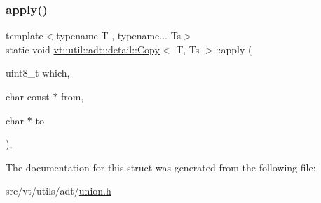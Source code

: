 \subsubsection{\texorpdfstring{apply()}{apply()}}
{\footnotesize\ttfamily template$<$typename T , typename... Ts$>$ \\
static void \hyperlink{structvt_1_1util_1_1adt_1_1detail_1_1_copy}{vt\+::util\+::adt\+::detail\+::\+Copy}$<$ T, Ts $>$\+::apply (\begin{DoxyParamCaption}\item[{uint8\+\_\+t}]{which,  }\item[{char const $\ast$}]{from,  }\item[{char $\ast$}]{to }\end{DoxyParamCaption})\hspace{0.3cm}{\ttfamily [inline]}, {\ttfamily [static]}}



The documentation for this struct was generated from the following file\+:\begin{DoxyCompactItemize}
\item 
src/vt/utils/adt/\hyperlink{union_8h}{union.\+h}\end{DoxyCompactItemize}
